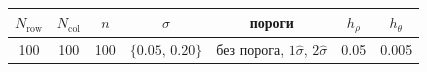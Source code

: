 \begin{tabular}{|c|c|c|c|c|c|c|}
\hline
$N_{\text{row}}$ & $N_{\text{col}}$ & $n$ & $\sigma$ & пороги & $h_\rho$ & $h_\theta$ \\
\hline
100 & 100 & 100 & $\{0.05,\,0.20\}$ & без порога, $1\hat\sigma$, $2\hat\sigma$ & 0.05 & 0.005 \\
\hline
\end{tabular}
